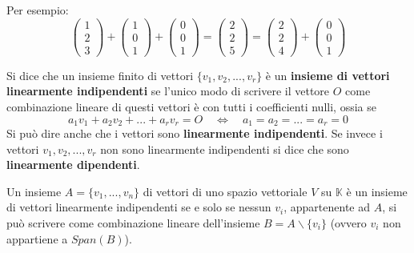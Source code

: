 \begin{example}
	Per esempio:
	\begin{equation*}
		\begin{pmatrix}
			1 \\ 2 \\ 3
		\end{pmatrix} +
		\begin{pmatrix}
			1 \\ 0 \\ 1
		\end{pmatrix} +
		\begin{pmatrix}
			0 \\ 0 \\ 1
		\end{pmatrix} =
		\begin{pmatrix}
			2 \\ 2 \\ 5
		\end{pmatrix} =
		\begin{pmatrix}
			2 \\ 2 \\ 4
		\end{pmatrix} +
		\begin{pmatrix}
			0 \\ 0 \\ 1
		\end{pmatrix}
	\end{equation*}
\end{example}

\begin{defn}
	Si dice che un insieme finito di vettori $\{v_1, v_2, ..., v_r\}$ \`e
	un \textbf{insieme di vettori linearmente indipendenti} se l'unico
	modo di scrivere il vettore $O$ come combinazione lineare di questi
	vettori \`e con tutti i coefficienti nulli, ossia se
	\begin{equation*}
		a_1 v_1 + a_2 v_2 + ... + a_r v_r = O \quad \Leftrightarrow \quad
		a_1 = a_2 = ... = a_r = 0
	\end{equation*}
	Si pu\`o dire anche che i vettori sono \textbf{linearmente indipendenti}.
	Se invece i vettori $v_1, v_2, ..., v_r$ non sono linearmente indipendenti
	si dice che sono \textbf{linearmente dipendenti}.
\end{defn}

\begin{proposition}
	Un insieme $A = \{v_1, ..., v_n\}$ di vettori di uno spazio
	vettoriale $V$ su $\mathbb{K}$ \`e un insieme di vettori linearmente
	indipendenti se e solo se nessun $v_i$, appartenente ad $A$, si pu\`o
	scrivere come combinazione lineare dell'insieme
	$B = A \backslash \{v_i\}$ (ovvero $v_i$ non appartiene a $Span(B)$).
\end{proposition}

